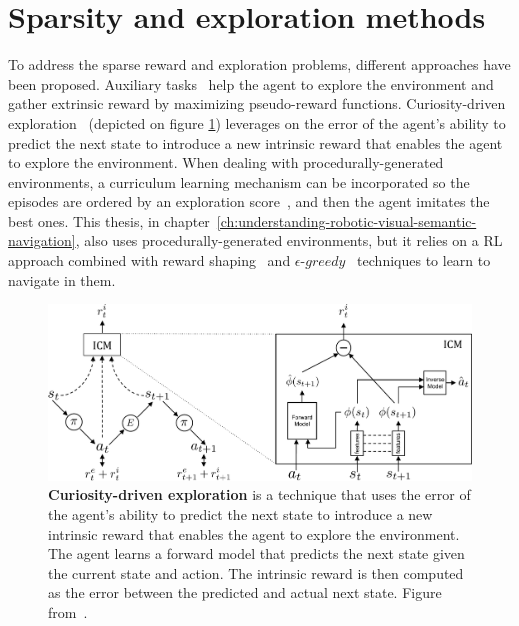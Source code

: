 \section{Sparsity and exploration methods}\label{sec:sparsity-and-exploration-methods}
To address the sparse reward and exploration problems, different approaches have been proposed.
Auxiliary tasks~\cite{jaderberg2016, ye2021} help the agent to explore the environment and gather extrinsic reward by maximizing pseudo-reward functions.
Curiosity-driven exploration~\cite{pathak2017} (depicted on figure \ref{fig:curiosity}) leverages on the error of the agent's ability to predict the next state to introduce a new intrinsic reward that enables the agent to explore the environment.
When dealing with procedurally-generated environments, a curriculum learning mechanism can be incorporated so the episodes are ordered by an exploration score~\cite{zha2020b}, and then the agent imitates the best ones.
This thesis, in chapter~\ref{ch:understanding-robotic-visual-semantic-navigation}, also uses procedurally-generated environments, but it relies on a RL approach combined with reward shaping~\cite{ng1999, jestel2021} and $\epsilon\text{-}greedy$~\cite{mnih2013} techniques to learn to navigate in them.

\begin{figure}
    \centering
    \includegraphics[width=\textwidth]{figures/related_work/curiosity}
    \caption{\textbf{Curiosity-driven exploration} is a technique that uses the error of the agent's ability to predict the next state to introduce a new intrinsic reward that enables the agent to explore the environment.
    The agent learns a forward model that predicts the next state given the current state and action.
    The intrinsic reward is then computed as the error between the predicted and actual next state.
    Figure from~\cite{pathak2017}.}
    \label{fig:curiosity}
\end{figure}

